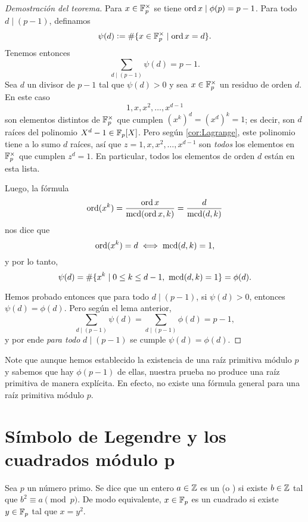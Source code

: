 \documentclass{article}
\theoremstyle{plain}
\begin{document}
\begin{proof}[Demostración del teorema]
  Para $x \in \mathbb{F}_p^\times$ se tiene $\operatorname{ord} x \mid \phi (p) = p-1$. Para todo
  $d \mid (p-1)$, definamos
  $$\psi (d) \mathrel{\mathop:}= \# \{ x \in \mathbb{F}_p^\times \mid \operatorname{ord} x = d \}.$$
  Tenemos entonces
  $$\sum_{d \mid (p-1)} \psi (d) = p-1.$$
  Sea $d$ un divisor de $p-1$ tal que $\psi (d) > 0$ y sea $x \in \mathbb{F}_p^\times$
  un residuo de orden $d$. En este caso
  $$1, x, x^2, \ldots, x^{d-1}$$
  son elementos distintos de $\mathbb{F}_p^\times$ que cumplen $(x^k)^d = (x^d)^k = 1$;
  es decir, son $d$ raíces del polinomio $X^d - 1 \in \mathbb{F}_p [X]$. Pero según
  \ref{cor:Lagrange}, este polinomio tiene a lo sumo $d$ raíces, así que
  $z = 1, x, x^2, \ldots, x^{d-1}$ son \emph{todos} los elementos en
  $\mathbb{F}_p^\times$ que cumplen $z^d = 1$. En particular, todos los elementos de
  orden $d$ están en esta lista.

  Luego, la fórmula
  $$\operatorname{ord} (x^k) = \frac{\operatorname{ord} x}{\operatorname{mcd} (\operatorname{ord} x, k)} = \frac{d}{\operatorname{mcd} (d,k)}$$
  nos dice que
  $$\operatorname{ord} (x^k) = d \iff \operatorname{mcd} (d,k) = 1,$$
  y por lo tanto,
  $$\psi (d) = \# \{ x^k \mid 0 \le k \le d-1, ~ \operatorname{mcd} (d,k) = 1 \} = \phi (d).$$
  
  Hemos probado entonces que para todo $d \mid (p-1)$, si $\psi (d) > 0$,
  entonces $\psi (d) = \phi (d)$. Pero según el lema anterior,
  $$\sum_{d \mid (p-1)} \psi (d) = \sum_{d \mid (p-1)} \phi (d) = p-1,$$
  y por ende \emph{para todo} $d \mid (p-1)$ se cumple $\psi (d) = \phi (d)$.
\end{proof}

\begin{comentario}
  Note que aunque hemos establecido la existencia de una raíz primitiva módulo
  $p$ y sabemos que hay $\phi (p-1)$ de ellas, nuestra prueba no produce una
  raíz primitiva de manera explícita. En efecto, no existe una fórmula general
  para una raíz primitiva módulo $p$.
\end{comentario}


\section{Símbolo de Legendre y los cuadrados módulo p}

\begin{definicion}
  Sea $p$ un número primo. Se dice que un entero $a\in \mathbb{Z}$ es un
   (o )  si existe
  $b\in \mathbb{Z}$ tal que $b^2 \equiv a \pmod{p}$. De modo equivalente, $x \in \mathbb{F}_p$
  es un cuadrado si existe $y \in \mathbb{F}_p$ tal que $x = y^2$.
\end{definicion}
\end{document}
